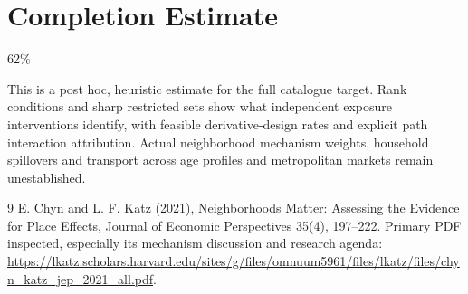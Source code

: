 \documentclass[11pt]{article}
\begin{document}
\section{Completion Estimate}
62\%

This is a post hoc, heuristic estimate for the full catalogue target.
Rank conditions and sharp restricted sets show what independent exposure interventions identify, with feasible derivative-design rates and explicit path interaction attribution. Actual neighborhood mechanism weights, household spillovers and transport across age profiles and metropolitan markets remain unestablished.

\begin{thebibliography}{9}
 E. Chyn and L. F. Katz (2021), Neighborhoods Matter: Assessing the Evidence for Place Effects, Journal of Economic Perspectives 35(4), 197--222. Primary PDF inspected, especially its mechanism discussion and research agenda:
\url{https://lkatz.scholars.harvard.edu/sites/g/files/omnuum5961/files/lkatz/files/chyn_katz_jep_2021_all.pdf}.
\end{thebibliography}
\end{document}
